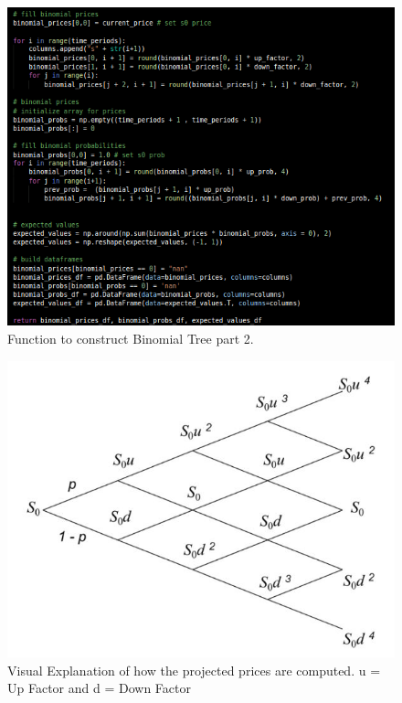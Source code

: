 \begin{figure}[H]
\centering
  \includegraphics[scale = .55]{imgs/binomial_tree_2.png}
  \caption{Function to construct Binomial Tree part 2.}
  \label{fig:binomial_2}
\end{figure}

\begin{figure}[H]
\centering
  \includegraphics[scale = .75]{imgs/binomial_example.JPG}
  \caption{Visual Explanation of how the projected prices are computed. u = Up Factor and d = Down Factor}
  \label{fig:binomial_ex}
\end{figure}

